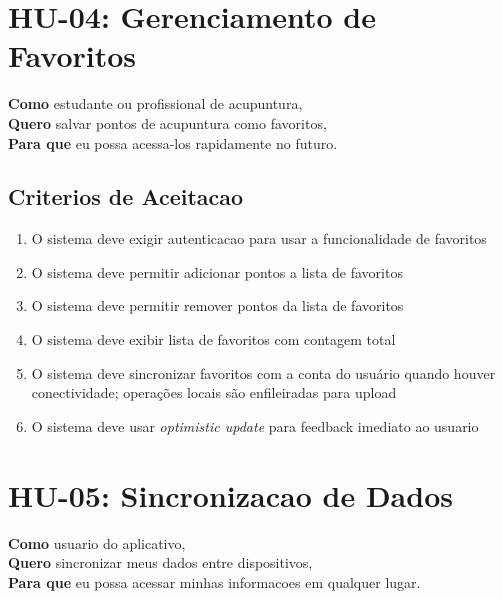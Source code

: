 \begin{apendicesenv}

\section{HU-04: Gerenciamento de Favoritos}
\label{hu:favoritos}

\textbf{Como} estudante ou profissional de acupuntura, \\
\textbf{Quero} salvar pontos de acupuntura como favoritos, \\
\textbf{Para que} eu possa acessa-los rapidamente no futuro.

\subsection*{Criterios de Aceitacao}

\begin{enumerate}
    \item O sistema deve exigir autenticacao para usar a funcionalidade de favoritos
    \item O sistema deve permitir adicionar pontos a lista de favoritos
    \item O sistema deve permitir remover pontos da lista de favoritos
    \item O sistema deve exibir lista de favoritos com contagem total
    \item O sistema deve sincronizar favoritos com a conta do usuário quando houver conectividade; operações locais são enfileiradas para upload
    \item O sistema deve usar \textit{optimistic update} para feedback imediato ao usuario
\end{enumerate}


\section{HU-05: Sincronizacao de Dados}
\label{hu:sync}

\textbf{Como} usuario do aplicativo, \\
\textbf{Quero} sincronizar meus dados entre dispositivos, \\
\textbf{Para que} eu possa acessar minhas informacoes em qualquer lugar.


\end{apendicesenv}
